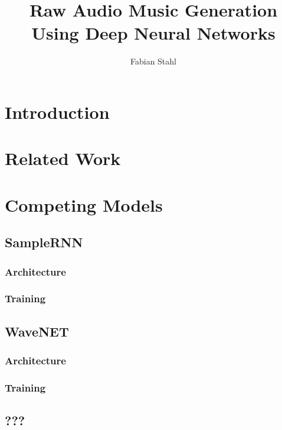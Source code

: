 \documentclass[12pt]{article}
\begin{document}
\title{Raw Audio Music Generation Using Deep Neural Networks}
\author{Fabian Stahl}

\maketitle

\tableofcontents

\begin{abstract}
\end{abstract}

\section{Introduction}



\section{Related Work}

\section{Competing Models}
\subsection{SampleRNN}
\subsubsection{Architecture}
\subsubsection{Training}

\subsection{WaveNET}
\subsubsection{Architecture}
\subsubsection{Training}

\subsection{???}
\end{document}
